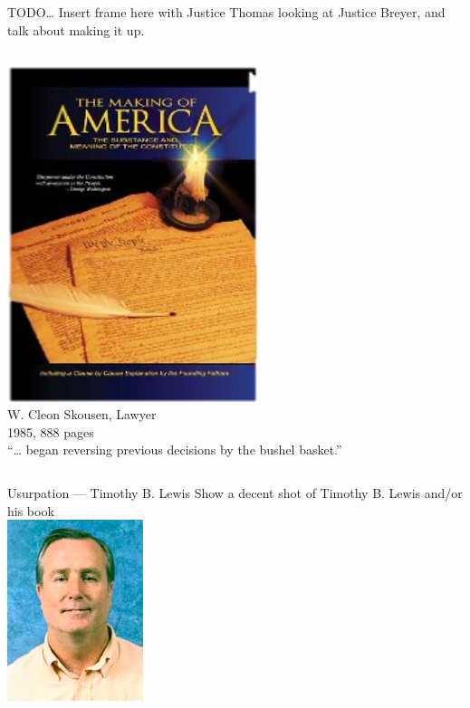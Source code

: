 \documentclass{beamer}
\begin{document}
\begin{frame}{TODO\ldots}
    Insert frame here with Justice Thomas looking at Justice Breyer, and talk about making it up.
\end{frame}

\begin{frame}
    \begin{columns}[onlytextwidth]
            \centering
            \includegraphics[width=0.75\textwidth]{img/making-of-america.png} \\
            W. Cleon Skousen, Lawyer \\
            1985, 888 pages \\

            ``\ldots {} began reversing previous decisions by the bushel basket.''
    \end{columns}
\end{frame}

\begin{frame}{Usurpation --- Timothy B. Lewis}
    Show a decent shot of Timothy B. Lewis and/or his book \\
    \includegraphics{img/timothy-lewis.png}
\end{frame}
\end{document}

